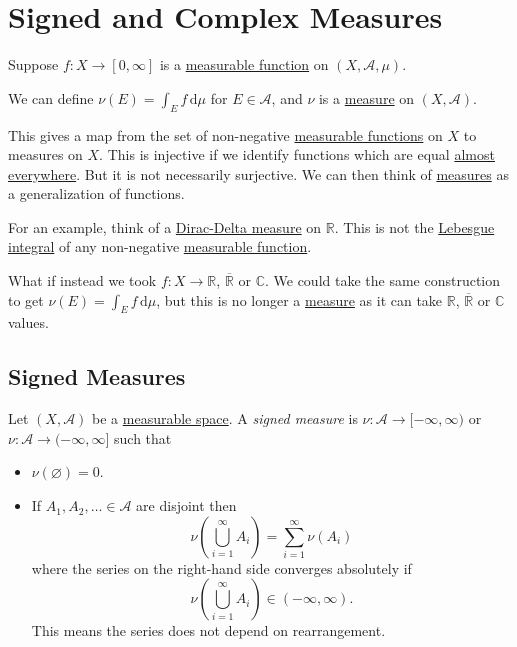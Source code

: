 \section{Signed and Complex Measures}
\begin{prev}
  Suppose \(f \colon X \to [0,\infty]\) is a \hyperref[def:measurable-function]{measurable function} on \((X, \mathcal{A}, \mu)\).

  We can define \(\nu(E) = \int_E f \,\mathrm{d} \mu\)  for \(E \in \mathcal{A}\), and \(\nu\) is a \hyperref[def:measure]{measure} on \((X, \mathcal{A})\).

  This gives a map from the set of non-negative \hyperref[def:measurable-function]{measurable functions} on \(X\) to measures on \(X\). This is
  injective if we identify functions which are equal \hyperref[def:mu-almost-everywhere]{almost everywhere}. But it is not necessarily surjective.
  We can then think of \hyperref[def:measure]{measures} as a generalization of functions.

  For an example, think of a \hyperref[eg:Dirac-Delta measure]{Dirac-Delta measure} on \(\mathbb{R}\). This is not the \hyperref[def:integrable]{Lebesgue integral}
  of any non-negative \hyperref[def:measurable-function]{measurable function}.
\end{prev}

What if instead we took \(f \colon X \to \mathbb{R}\), \(\overline{\mathbb{R}}\) or \(\mathbb{C}\). We could take the same construction to get
\(\nu(E) = \int_E f \,\mathrm{d} \mu\), but this is no longer a \hyperref[def:measure]{measure} as it can take \(\mathbb{R}\), \(\overline{\mathbb{R}}\) or \(\mathbb{C}\) values.

\subsection{Signed Measures}
\begin{definition}\label{def:signed-measure}
  Let \((X, \mathcal{A})\) be a \hyperref[def:measurable-space]{measurable space}. A \emph{signed measure} is \(\nu \colon \mathcal{A} \to [-\infty,\infty)\) or
    \(\nu \colon \mathcal{A} \to (-\infty, \infty]\) such that
  \begin{itemize}
    \item \(\nu(\varnothing ) = 0\).
    \item If \(A_1,A_2,\ldots \in \mathcal{A}\) are disjoint then
          \[
            \nu\left( \bigcup_{i=1}^\infty A_i \right) = \sum_{i=1}^\infty \nu(A_i)
          \]
          where the series on the right-hand side converges absolutely if
          \[
            \nu\left( \bigcup_{i=1}^\infty A_{i} \right) \in (-\infty,\infty).
          \]
          This means the series does not depend on rearrangement.
  \end{itemize}
\end{definition}

